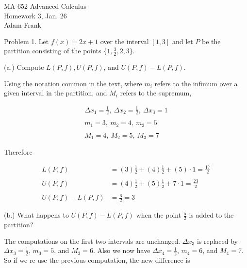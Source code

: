 \documentclass{article}
\begin{document}
  \begin{center} \Large
    MA-652 Advanced Calculus\\
    Homework 3, Jan. 26 \\
    Adam Frank
  \end{center}

  \vspace{1cm}

  {\Large \color{Sepia} Problem 1. Let $f(x)=2x+1$ over the interval $[1,3]$ and let $P$ be the partition consisting of the points $\{1,\frac 3 2, 2, 3 \}$.

  (a.) Compute $L(P,f),U(P,f)$, and $U(P,f)-L(P,f)$.}

  \vspace{1cm}

  Using the notation common in the text, where $m_i$ refers to the infimum over a given interval in the partition, and $M_i$ refers to the supremum,

  \begin{align*}
    \Delta x_1 = \frac 1 2, \ \Delta x_2 = \frac 1 2, \ \Delta x_3 = 1\\\\
    m_1 = 3, \ m_2 = 4, \ m_3 = 5\\\\
    M_1 = 4, \ M_2 = 5, \ M_3 = 7
  \end{align*}

  Therefore

  \begin{align*}
    L(P,f)&=(3)\frac 1 2 + (4) \frac 1 2 + (5)\cdot 1 = \frac{17}{2}\\\\
    U(P,f)&=(4)\frac 1 2 + (5)\frac 1 2 + 7\cdot 1 = \frac{23}{2}\\\\
    U(P,f)-L(P,f)&=\frac{6}{2}=3
  \end{align*}



  \vspace{1cm}

  {\Large \color{Sepia} (b.) What happens to $U(P,f)-L(P,f)$ when the point $\frac 5 2$ is added to the partition?}

  \vspace{1cm}

  The computations on the first two intervals are unchanged.  $\Delta x_3$ is replaced by $\Delta x_3=\frac 1 2$, $m_3=5$, and $M_3 = 6$.  Also we now have $\Delta x_4 = \frac 1 2$, $m_4=6$, and $M_4=7$.  So if we re-use the previous computation, the new difference is
\end{document}
